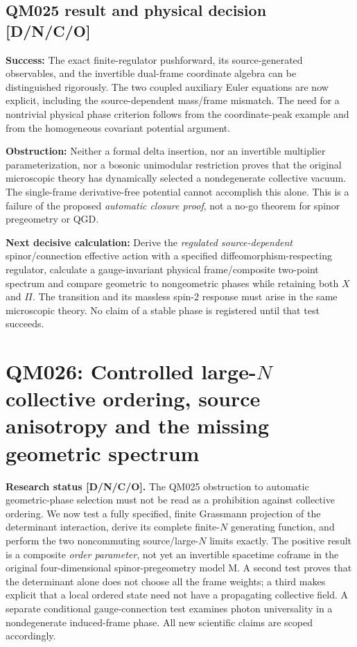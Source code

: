 \documentclass[11pt,a4paper]{article}
\begin{document}
\subsection{QM025 result and physical decision [D/N/C/O]}
\label{sec:v15-verdict}
\textbf{Success:} The exact finite-regulator pushforward, its source-generated observables, and the invertible dual-frame coordinate algebra can be distinguished rigorously. The two coupled auxiliary Euler equations are now explicit, including the source-dependent mass/frame mismatch. The need for a nontrivial physical phase criterion follows from the coordinate-peak example and from the homogeneous covariant potential argument.\par
\textbf{Obstruction:} Neither a formal delta insertion, nor an invertible multiplier parameterization, nor a bosonic unimodular restriction proves that the original microscopic theory has dynamically selected a nondegenerate collective vacuum. The single-frame derivative-free potential cannot accomplish this alone. This is a failure of the proposed \emph{automatic closure proof}, not a no-go theorem for spinor pregeometry or QGD.\par
\textbf{Next decisive calculation:} Derive the \emph{regulated source-dependent} spinor/connection effective action with a specified diffeomorphism-respecting regulator, calculate a gauge-invariant physical frame/composite two-point spectrum and compare geometric to nongeometric phases while retaining both $X$ and $\Pi$. The transition and its massless spin-2 response must arise in the same microscopic theory. No claim of a stable phase is registered until that test succeeds.

\clearpage
\section{QM026: Controlled large-$N$ collective ordering, source anisotropy and the missing geometric spectrum}
\label{sec:v16-qm026}
\textbf{Research status [D/N/C/O].} The QM025 obstruction to automatic geometric-phase selection must not be read as a prohibition against collective ordering. We now test a fully specified, finite Grassmann projection of the determinant interaction, derive its complete finite-$N$ generating function, and perform the two noncommuting source/large-$N$ limits exactly. The positive result is a composite \emph{order parameter}, not yet an invertible spacetime coframe in the original four-dimensional spinor-pregeometry model M. A second test proves that the determinant alone does not choose all the frame weights; a third makes explicit that a local ordered state need not have a propagating collective field. A separate conditional gauge-connection test examines photon universality in a nondegenerate induced-frame phase. All new scientific claims are scoped accordingly.
\end{document}
